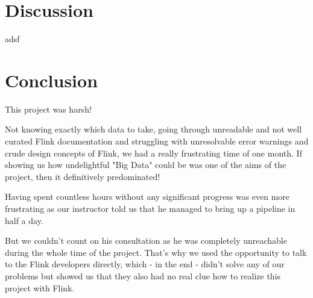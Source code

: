 \documentclass{bioinfo}
\begin{document}
\begin{comment}
\begin{figure}[!tpb]%
\fboxsep=0pt\colorbox{gray}{\begin{minipage}[t]{235pt} \vbox to 100pt{\vfill\hbox to
235pt{\hfill\fontsize{24pt}{24pt}\selectfont FPO\hfill}\vfill}
\end{minipage}}
\caption{Caption, caption.}\label{fig:01}
\end{figure}
\end{comment}


\section{Discussion}


adsf


%
%






\section{Conclusion}

This project was harsh!

Not knowing exactly which data to take, going through unreadable and not well curated Flink documentation and struggling with unresolvable error warnings and crude design concepts of Flink, we had a really frustrating time of one month.
If showing us how undelightful "Big Data" could be was one of the aims of the project, then it definitively predominated!

Having spent countless hours without any significant progress was even more frustrating as our instructor told us that he managed to bring up a pipeline in half a day.

But we couldn't count on his consultation as he was completely unreachable during the whole time of the project. That's why we used the opportunity to talk to the Flink developers directly, which - in the end - didn't solve any of our problems but showed us that they also had no real clue how to realize this project with Flink.
\end{document}
